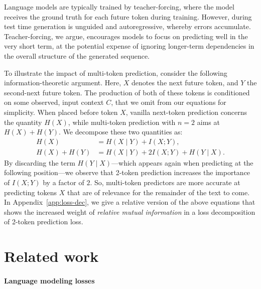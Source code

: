 \documentclass{article}
\theoremstyle{plain}
\theoremstyle{definition}
\theoremstyle{remark}
\begin{document}
Language models are typically trained by teacher-forcing, where the model receives the ground truth for each future token during training. 
However, during test time generation is unguided and autoregressive, whereby errors accumulate.
Teacher-forcing, we argue, encourages models to focus on predicting well in the very short term, at the potential expense of ignoring longer-term dependencies in the overall structure of the generated sequence.

To illustrate the impact of multi-token prediction, consider the following information-theoretic argument.
Here, $X$ denotes the next future token, and $Y$ the second-next future token.
The production of both of these tokens is conditioned on some observed, input context $C$, that we omit from our equations for simplicity.
When placed before token $X$, vanilla next-token prediction concerns the quantity $H(X)$, while multi-token prediction with $n=2$ aims at $H(X) + H(Y)$.
We decompose these two quantities as:
\begin{align*}
  H(X)        &= H(X \mid Y) +   I(X; Y),\\
  H(X) + H(Y) &= H(X \mid Y) + 2 I(X; Y) + H(Y \mid X).
\end{align*}
By discarding the term $H(Y \mid X)$---which appears again when predicting at the following position---we observe that 2-token prediction increases the importance of $I(X; Y)$ by a factor of $2$.
So, multi-token predictors are more accurate at predicting tokens $X$ that are of relevance for the remainder of the text to come. In Appendix~\ref{app:loss-dec}, we give a relative version of the above equations that shows the increased weight of \emph{relative mutual information} in a loss decomposition of 2-token prediction loss.

\section{Related work}

\paragraph{Language modeling losses}
\end{document}
